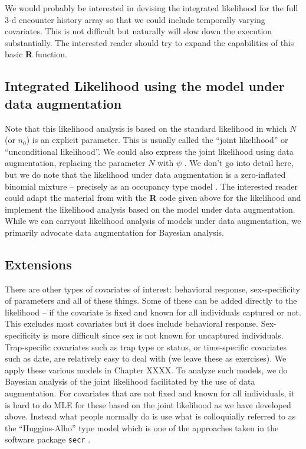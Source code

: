 {  We would probably be interested in devising the
  integrated likelihood for the full 3-d encounter history array so
  that we could include temporally varying covariates. This is not
  difficult but naturally will slow down the execution
  substantially. The interested reader should try to expand the
  capabilities of this basic {\bf R} function.  }


\subsection{Integrated Likelihood using the model under data augmentation } 

Note that this likelihood analysis is based on the standard likelihood
in which $N$ (or $n_{0}$) is an explicit parameter. This is usually called
the ``joint likelihood'' or ``unconditional likelihood''.  We could also
express the joint likelihood using data augmentation, replacing the
parameter $N$ with $\psi$ \citep[e.g.,][sec. xyz]{royle_dorazio:2008}.
We don't go into detail here, but we do note that the
likelihood under data augmentation is a zero-inflated binomial
mixture – precisely as an occupancy type model \citep{royle:2006}.
The interested reader could adapt the material from \citet{royle_dorazio:2008}
with the {\bf R} code given above for the likelihood and
implement the likelihood analysis based on the model under data
augmentation. While we can carryout likelihood analysis of
models under data augmentation, we primarily advocate data
augmentation for Bayesian analysis.


\subsection{ Extensions}

There are other types of covariates of interest: behavioral response,
sex-specificity of parameters and all of these things. Some of these
can be added directly to the likelihood – if the covariate is fixed
and known for all individuals captured or not. This excludes most
covariates but it does include behavioral response. Sex-specificity is
more difficult since sex is not known for uncaptured
individuals. Trap-specific covariates such as trap type or status, or
time-specific covariates such as date, are relatively easy to deal
with (we leave these as exercises).  We apply these various models in
Chapter XXXX. To analyze such models, we do Bayesian analysis of the
joint likelihood facilitated by the use of data augmentation. For
covariates that are not fixed and known for all individuals, it is
hard to do MLE for these based on the joint likelihood as we have
developed above. Instead what people normally do is use what is
colloquially referred to as the ``Huggins-Alho'' type model which is one
of the approaches taken in the software package 
\mbox{\tt secr} \citep[][see sec. \ref{mle.sec.secr}]{efford:2011}.


